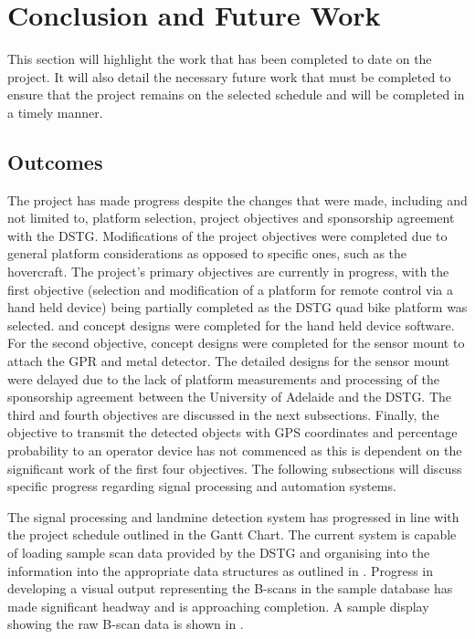 \documentclass[main.tex]{subfiles}
\begin{document}
\chapter{Conclusion and Future Work}
This section will highlight the work that has been completed to date on the project. It will also detail the necessary future work that must be completed to ensure that the project remains on the selected schedule and will be completed in a timely manner.
\section{Outcomes}

The project has made progress despite the changes that were made, including and not limited to, platform selection, project objectives and sponsorship agreement with the DSTG. Modifications of the project objectives were completed due to general platform considerations as opposed to specific ones, such as the hovercraft. The project's primary objectives are currently in progress, with the first objective (selection and modification of a platform for remote control via a hand held device) being partially completed as the DSTG quad bike platform was selected. and concept designs were completed for the hand held device software. For the second objective, concept designs were completed for the sensor mount to attach the GPR and metal detector. The detailed designs for the sensor mount were delayed due to the lack of platform measurements and processing of the sponsorship agreement between the University of Adelaide and the DSTG. The third and fourth objectives are discussed in the next subsections. Finally, the objective to transmit the detected objects with GPS coordinates and percentage probability to an operator device has not commenced as this is dependent on the significant work of the first four objectives. The following subsections will discuss specific progress regarding signal processing and automation systems.

The signal processing and landmine detection system has progressed in line with the project schedule outlined in the Gantt Chart. The current system is capable of loading sample scan data provided by the DSTG and organising into the information into the appropriate data structures as outlined in . 
Progress in developing a visual output representing the B-scans in the sample database has made significant headway and is approaching completion. A sample display showing the raw B-scan data is shown in .
\end{document}
